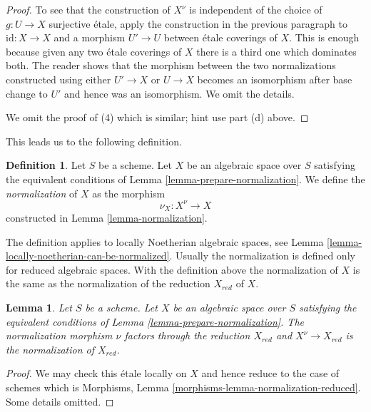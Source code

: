 \documentclass{stacks-project}
\theoremstyle{plain}
\newtheorem{lemma}[subsection]{Lemma}
\theoremstyle{definition}
\newtheorem{definition}[subsection]{Definition}
\theoremstyle{remark}
\numberwithin{equation}{subsection}
\begin{document}
\begin{proof}
\medskip\noindent
To see that the construction of $X^\nu$ is independent of the choice
of $g : U \to X$ surjective \'etale, apply the construction in the
previous paragraph to $\text{id} : X \to X$ and a morphism
$U' \to U$ between \'etale coverings of $X$. This is enough because
given any two \'etale coverings of $X$ there is a third one which
dominates both. The reader shows that the morphism between the two
normalizations constructed using either $U' \to X$ or $U \to X$
becomes an isomorphism after base change to $U'$ and hence was
an isomorphism. We omit the details.

\medskip\noindent
We omit the proof of (4) which is similar; hint use part (d) above.
\end{proof}

\noindent
This leads us to the following definition.

\begin{definition}
\label{definition-normalization}
Let $S$ be a scheme. Let $X$ be an algebraic space over $S$ satisfying the
equivalent conditions of Lemma \ref{lemma-prepare-normalization}.
We define the {\it normalization} of $X$ as the morphism
$$
\nu_X : X^\nu \longrightarrow X
$$
constructed in Lemma \ref{lemma-normalization}.
\end{definition}

\noindent
The definition applies to locally Noetherian algebraic
spaces, see Lemma \ref{lemma-locally-noetherian-can-be-normalized}.
Usually the normalization is defined only for reduced algebraic
spaces. With the definition above the normalization of $X$ is the same
as the normalization of the reduction $X_{red}$ of $X$.

\begin{lemma}
\label{lemma-normalization-reduced}
Let $S$ be a scheme. Let $X$ be an algebraic space over $S$ satisfying the
equivalent conditions of Lemma \ref{lemma-prepare-normalization}.
The normalization morphism $\nu$ factors through the reduction $X_{red}$
and $X^\nu \to X_{red}$ is the normalization of $X_{red}$.
\end{lemma}

\begin{proof}
We may check this \'etale locally on $X$ and hence reduce to the case
of schemes which is
Morphisms, Lemma \ref{morphisms-lemma-normalization-reduced}.
Some details omitted.
\end{proof}
\end{document}
